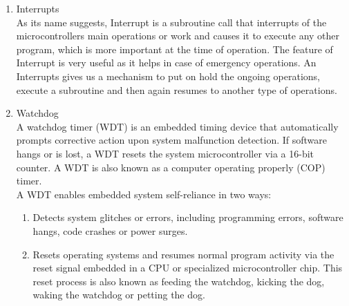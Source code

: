 \begin{enumerate}
\item Interrupts\\
As its name suggests, Interrupt is a subroutine call that interrupts of the microcontrollers main operations or work and causes it to execute any other program, which is more important at the time of operation. The feature of Interrupt is very useful as it helps in case of emergency operations. An Interrupts gives us a mechanism to put on hold the ongoing operations, execute a subroutine and then again resumes to another type of operations.\\ 
\item Watchdog \\
A watchdog timer (WDT) is an embedded timing device that automatically prompts corrective action upon system malfunction detection. If software hangs or is lost, a WDT resets the system microcontroller via a 16-bit counter. A WDT is also known as a computer operating properly (COP) timer.\\
A WDT enables embedded system self-reliance in two ways:
\begin{enumerate}
\item Detects system glitches or errors, including programming errors, software hangs, code crashes or power surges. 
\item Resets operating systems and resumes normal program activity via the reset signal embedded in a CPU or specialized microcontroller chip. This reset process is also known as feeding the watchdog, kicking the dog, waking the watchdog or petting the dog. 
\end{enumerate}
\end{enumerate}
